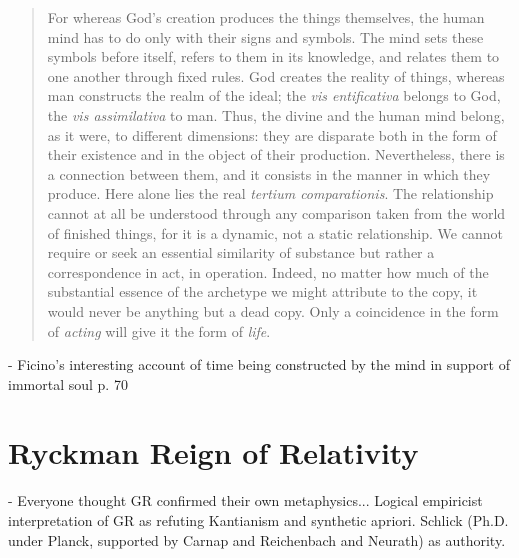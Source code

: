 \begin{quote}
    For whereas God's creation produces the things themselves, the human mind has to do only with their signs and symbols.  The mind sets these symbols before itself, refers to them in its knowledge, and relates them to one another through fixed rules.  God creates the reality of things, whereas man constructs the realm of the ideal; the \emph{vis entificativa} belongs to God, the \emph{vis assimilativa} to man.  Thus, the divine and the human mind belong, as it were, to different dimensions: they are disparate both in the form of their existence and in the object of their production.  Nevertheless, there is a connection between them, and it consists in the manner in which they produce.  Here alone lies the real \emph{tertium comparationis}.  The relationship cannot at all be understood through any comparison taken from the world of finished things, for it is a dynamic, not a static relationship.  We cannot require or seek an essential similarity of substance but rather a correspondence in act, in operation.  Indeed, no matter how much of the substantial essence of the archetype we might attribute to the copy, it would never be anything but a dead copy.  Only a coincidence in the form of \emph{acting} will give it the form of \emph{life}.

    \citep[p. 68]{Cassirer1927}
\end{quote}

- Ficino's interesting account of time being constructed by the mind in support of immortal soul p. 70




\section{Ryckman Reign of Relativity}

- Everyone thought GR confirmed their own metaphysics... Logical empiricist interpretation of GR as refuting Kantianism and synthetic apriori.  Schlick (Ph.D. under Planck, supported by Carnap and Reichenbach and Neurath) as authority.  

